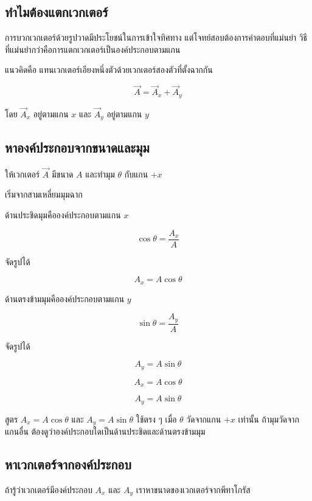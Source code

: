 \documentclass[12pt,a4paper]{report}
\begin{document}
\subsection{ทำไมต้องแตกเวกเตอร์}

การบวกเวกเตอร์ด้วยรูปวาดมีประโยชน์ในการเข้าใจทิศทาง แต่โจทย์สอบต้องการคำตอบที่แม่นยำ วิธีที่แม่นยำกว่าคือการแตกเวกเตอร์เป็นองค์ประกอบตามแกน

แนวคิดคือ แทนเวกเตอร์เอียงหนึ่งตัวด้วยเวกเตอร์สองตัวที่ตั้งฉากกัน

\[
\vec{A}=\vec{A}_x+\vec{A}_y
\]

โดย $\vec{A}_x$ อยู่ตามแกน $x$ และ $\vec{A}_y$ อยู่ตามแกน $y$

\subsection{หาองค์ประกอบจากขนาดและมุม}

ให้เวกเตอร์ $\vec{A}$ มีขนาด $A$ และทำมุม $\theta$ กับแกน $+x$

เริ่มจากสามเหลี่ยมมุมฉาก

ด้านประชิดมุมคือองค์ประกอบตามแกน $x$

\[
\cos\theta=\frac{A_x}{A}
\]

จัดรูปได้

\[
A_x=A\cos\theta
\]

ด้านตรงข้ามมุมคือองค์ประกอบตามแกน $y$

\[
\sin\theta=\frac{A_y}{A}
\]

จัดรูปได้

\[
A_y=A\sin\theta
\]

\begin{tcolorbox}[title=สูตรแตกเวกเตอร์ เมื่อมุมวัดจากแกน $+x$]
\[
A_x=A\cos\theta
\]

\[
A_y=A\sin\theta
\]
\end{tcolorbox}

\begin{tcolorbox}[title=ระวัง]
สูตร $A_x=A\cos\theta$ และ $A_y=A\sin\theta$ ใช้ตรง ๆ เมื่อ $\theta$ วัดจากแกน $+x$ เท่านั้น ถ้ามุมวัดจากแกนอื่น ต้องดูว่าองค์ประกอบใดเป็นด้านประชิดและด้านตรงข้ามมุม
\end{tcolorbox}

\subsection{หาเวกเตอร์จากองค์ประกอบ}

ถ้ารู้ว่าเวกเตอร์มีองค์ประกอบ $A_x$ และ $A_y$ เราหาขนาดของเวกเตอร์จากพีทาโกรัส
\end{document}
